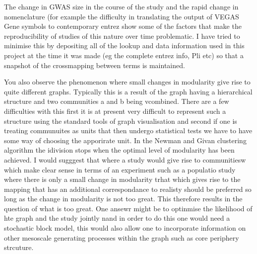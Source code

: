 The change in GWAS size in the course of the study and the rapid change in nomenclature (for example the difficulty in translating the output of VEGAS Gene symbols to contemporary entrez show some of the factors that make the reproducibility of studies of this nature over time problematic. I have tried to minimise this by depositing all of the lookup and data information used in this project at the time it was made (eg the complete entrez info, Pli etc) so that a snapshot of the crossmapping between terms is maintained.


You also observe the phenomenon where small changes in modularity give rise to quite different graphs. Typically this is a result of the graph having a hierarchical structure and two communities a and b being vcombined. There are a few difficulties with this first it is at present very difficult to represent such a structure using the standard tools of graph visualisation and second if one is treating communuites as units that then undergo statistical tests we have to have some way of choosing the apporirate unit. In the Newman and Givan clustering algorithm the idivision stops when the optimal level of modularity has been achieved. I would sugggest that where a study would give rise to communitiesw which make clear sense in terms of an experiment such as a populatio study where there is only a small change in modularity trhat which gives rise to the mapping that has an additional correspondance to realisty should be preferred so long as the change in modularity is not too great. This therefore results in the question of what is too great. One ansewr might be to optinmise the likelihood of hte graph and the study jointly nand in order to do this one would need a stochastic block model, this would also allow one to incorporate information on other mesoscale generating processes within the graph such as core periphery strcuture.

